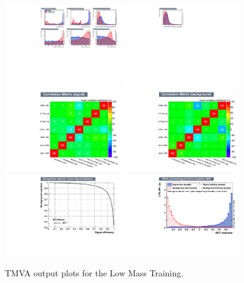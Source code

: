 \begin{figure}[h]
  \centering
  \includegraphics[width=0.45\textwidth]{figures/sec-cats/mva/vars1_lm400}\hfil
  \includegraphics[width=0.45\textwidth]{figures/sec-cats/mva/vars2_lm400}\hfil
  \includegraphics[width=0.45\textwidth]{figures/sec-cats/mva/corsS_lm400}\hfil
  \includegraphics[width=0.45\textwidth]{figures/sec-cats/mva/corsB_lm400}\hfil
  \includegraphics[width=0.45\textwidth]{figures/sec-cats/mva/ROC_lm400}\hfil
  \includegraphics[width=0.45\textwidth]{figures/sec-cats/mva/discr_lm400}\hfil
  \caption{TMVA output plots for the Low Mass Training.}
  \label{fig:mva_lm}
\end{figure}

